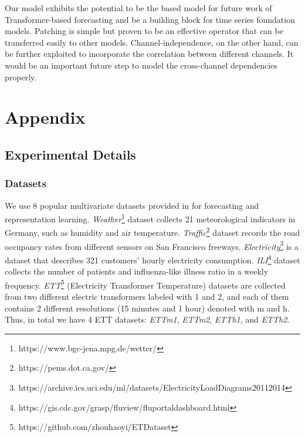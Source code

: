 \documentclass{article} \usepackage{iclr2023_conference,times}
\begin{document}
Our model exhibits the potential to be the based model for future work of Transformer-based forecasting and be a building block for time series foundation models. Patching is simple but proven to be an effective operator that can be transferred easily to other models. Channel-independence, on the other hand, can be further exploited to incorporate the correlation between different channels. It would be an important future step to model the cross-channel dependencies properly.






\newpage 
\appendix
\section{Appendix}


\subsection{Experimental Details}
\label{append:exp}

\subsubsection{Datasets}

We use $8$ popular multivariate datasets provided in \citep{autoformer} for forecasting and representation learning. \textit{Weather}\footnote{https://www.bgc-jena.mpg.de/wetter/} dataset collects 21 meteorological indicators in Germany, such as humidity and air temperature. \textit{Traffic}\footnote{https://pems.dot.ca.gov/} dataset records the road occupancy rates from different sensors on San Francisco freeways. \textit{Electricity}\footnote{https://archive.ics.uci.edu/ml/datasets/ElectricityLoadDiagrams20112014} is a dataset that describes 321 customers' hourly electricity consumption. \textit{ILI}\footnote{https://gis.cdc.gov/grasp/fluview/fluportaldashboard.html} dataset collects the number of patients and influenza-like illness ratio in a weekly frequency. \textit{ETT}\footnote{https://github.com/zhouhaoyi/ETDataset} (Electricity Transformer Temperature) datasets are collected from two different electric transformers labeled with 1 and 2, and each of them contains 2 different resolutions (15 minutes and 1 hour) denoted with m and h. Thus, in total we have 4 ETT datasets: \textit{ETTm1}, \textit{ETTm2}, \textit{ETTh1}, and \textit{ETTh2}. 
\end{document}
